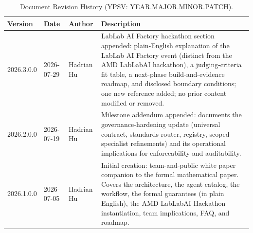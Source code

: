 \documentclass[12pt]{article}
\begin{document}
\begin{table}[H]
\centering
\caption{Document Revision History (YPSV: YEAR.MAJOR.MINOR.PATCH).}
\begin{tabular}{@{}lllp{7.0cm}@{}}
\toprule
\textbf{Version} & \textbf{Date} & \textbf{Author} & \textbf{Description} \\
\midrule
2026.3.0.0 & 2026-07-29 & Hadrian Hu & LabLab AI Factory hackathon
section appended: plain-English explanation of the LabLab AI Factory
event (distinct from the AMD LabLabAI hackathon), a judging-criteria
fit table, a next-phase build-and-evidence roadmap, and disclosed
boundary conditions; one new reference added; no prior content
modified or removed. \\
2026.2.0.0 & 2026-07-19 & Hadrian Hu & Milestone addendum appended:
documents the governance-hardening update (universal contract,
standards router, registry, scoped specialist refinements) and its
operational implications for enforceability and auditability. \\
2026.1.0.0 & 2026-07-05 & Hadrian Hu &
  Initial creation: team-and-public white paper companion to the
  formal mathematical paper.
  Covers the architecture, the agent catalog, the workflow, the
  formal guarantees (in plain English), the AMD LabLabAI Hackathon
  instantiation, team implications, FAQ, and roadmap. \\
\bottomrule
\end{tabular}
\end{table}
\end{document}
